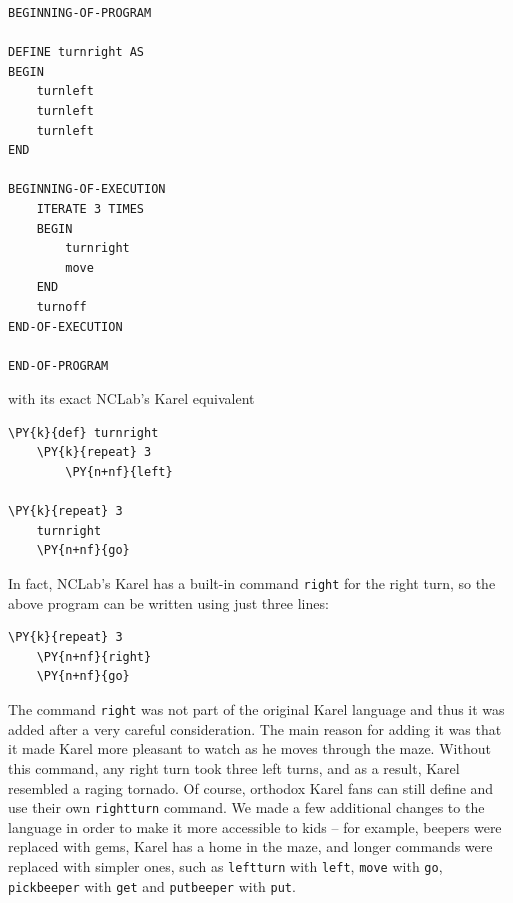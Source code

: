 \begin{bbox}
\begin{verbatim}
BEGINNING-OF-PROGRAM
 
DEFINE turnright AS
BEGIN
    turnleft
    turnleft
    turnleft
END
 
BEGINNING-OF-EXECUTION
    ITERATE 3 TIMES
    BEGIN
        turnright
        move
    END
    turnoff
END-OF-EXECUTION
 
END-OF-PROGRAM
\end{verbatim}
\end{bbox}
\vspace{6mm}

\noindent
with its exact NCLab's Karel equivalent\\

\begin{bbox}
\begin{Verbatim}[commandchars=\\\{\}]
\PY{k}{def} turnright
    \PY{k}{repeat} 3
        \PY{n+nf}{left}
 
\PY{k}{repeat} 3
    turnright
    \PY{n+nf}{go}
\end{Verbatim}
\end{bbox}
\vspace{6mm}

\noindent
In fact, NCLab's Karel has a built-in command {\tt right} for the
right turn, so the above program can be written using just three lines:\\

\begin{bbox}
\begin{Verbatim}[commandchars=\\\{\}]
\PY{k}{repeat} 3
    \PY{n+nf}{right}
    \PY{n+nf}{go}
\end{Verbatim}
\end{bbox}
\vspace{6mm}

\noindent
The command {\tt right} was not part of the original Karel language  and thus 
it was added after a very careful consideration. The main reason for adding it was that it made 
Karel more pleasant to watch as he moves through the maze. Without this command, any right turn 
took three left turns, and as a result, Karel resembled a raging tornado.
Of course, orthodox Karel fans can still define and use their own {\tt rightturn} 
command. We made a few additional changes to the language in order to make 
it more accessible to kids -- for example, beepers were replaced with gems, Karel 
has a home in the maze, and longer commands were replaced with simpler ones, such as 
{\tt leftturn} with {\tt left}, {\tt move} with {\tt go}, 
{\tt pickbeeper} with {\tt get} and {\tt putbeeper} with {\tt put}. 

